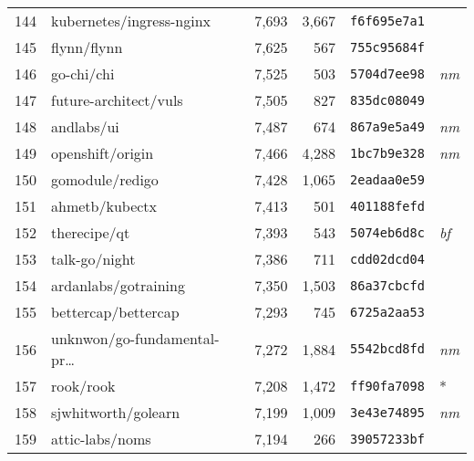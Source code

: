 {\begin{supertabular}{llrrll}
        144 &           kubernetes/ingress-nginx &  7,693 &  3,667 &  \texttt{f6f695e7a1} &              \\
        145 &                        flynn/flynn &  7,625 &    567 &  \texttt{755c95684f} &              \\
        146 &                         go-chi/chi &  7,525 &    503 &  \texttt{5704d7ee98} &  \textit{nm} \\
        147 &              future-architect/vuls &  7,505 &    827 &  \texttt{835dc08049} &              \\
        148 &                         andlabs/ui &  7,487 &    674 &  \texttt{867a9e5a49} &  \textit{nm} \\
        149 &                   openshift/origin &  7,466 &  4,288 &  \texttt{1bc7b9e328} &  \textit{nm} \\
        150 &                    gomodule/redigo &  7,428 &  1,065 &  \texttt{2eadaa0e59} &              \\
        151 &                     ahmetb/kubectx &  7,413 &    501 &  \texttt{401188fefd} &              \\
        152 &                       therecipe/qt &  7,393 &    543 &  \texttt{5074eb6d8c} &  \textit{bf} \\
        153 &                      talk-go/night &  7,386 &    711 &  \texttt{cdd02dcd04} &              \\
        154 &               ardanlabs/gotraining &  7,350 &  1,503 &  \texttt{86a37cbcfd} &              \\
        155 &                bettercap/bettercap &  7,293 &    745 &  \texttt{6725a2aa53} &              \\
        156 &    unknwon/go-fundamental-pr\ldots &  7,272 &  1,884 &  \texttt{5542bcd8fd} &  \textit{nm} \\
        157 &                          rook/rook &  7,208 &  1,472 &  \texttt{ff90fa7098} &            * \\
        158 &                sjwhitworth/golearn &  7,199 &  1,009 &  \texttt{3e43e74895} &  \textit{nm} \\
        159 &                    attic-labs/noms &  7,194 &    266 &  \texttt{39057233bf} &              \\

\end{supertabular}}
